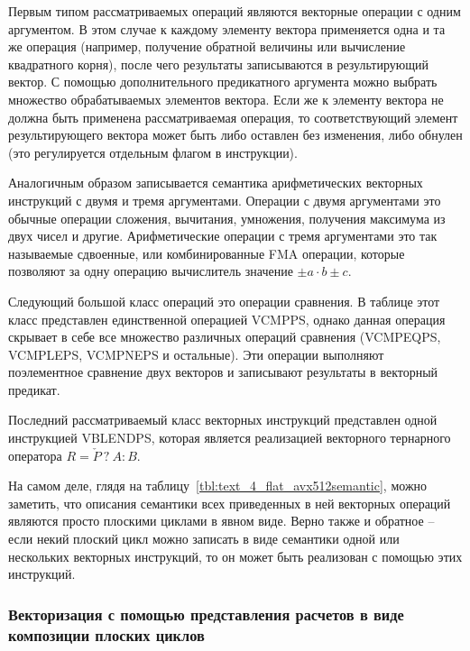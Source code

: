 Первым типом рассматриваемых операций являются векторные операции с одним аргументом.
В этом случае к каждому элементу вектора применяется одна и та же операция (например, получение обратной величины или вычисление квадратного корня), после чего результаты записываются в результирующий вектор.
С помощью дополнительного предикатного аргумента можно выбрать множество обрабатываемых элементов вектора.
Если же к элементу вектора не должна быть применена рассматриваемая операция, то соответствующий элемент результирующего вектора может быть либо оставлен без изменения, либо обнулен (это регулируется отдельным флагом в инструкции).

Аналогичным образом записывается семантика арифметических векторных инструкций с двумя и тремя аргументами.
Операции с двумя аргументами это обычные операции сложения, вычитания, умножения, получения максимума из двух чисел и другие.
Арифметические операции с тремя аргументами это так называемые сдвоенные, или комбинированные FMA\label{abbr:fma-3} операции, которые позволяют за одну операцию вычислитель значение $\pm a \cdot b \pm c$.

Следующий большой класс операций это операции сравнения.
В таблице этот класс представлен единственной операцией VCMPPS, однако данная операция скрывает в себе все множество различных операций сравнения (VCMPEQPS, VCMPLEPS, VCMPNEPS и остальные).
Эти операции выполняют поэлементное сравнение двух векторов и записывают результаты в векторный предикат.

Последний рассматриваемый класс векторных инструкций представлен одной инструкцией VBLENDPS, которая является реализацией векторного тернарного оператора $R = \check{P} \ ? \ A : B$.

На самом деле, глядя на таблицу~\ref{tbl:text_4_flat_avx512semantic}, можно заметить, что описания семантики всех приведенных в ней векторных операций являются просто плоскими циклами в явном виде.
Верно также и обратное -- если некий плоский цикл можно записать в виде семантики одной или нескольких векторных инструкций, то он может быть реализован с помощью этих инструкций.

\subsubsection{Векторизация с помощью представления расчетов в виде композиции плоских циклов}\label{sec:text_4_ibm}

